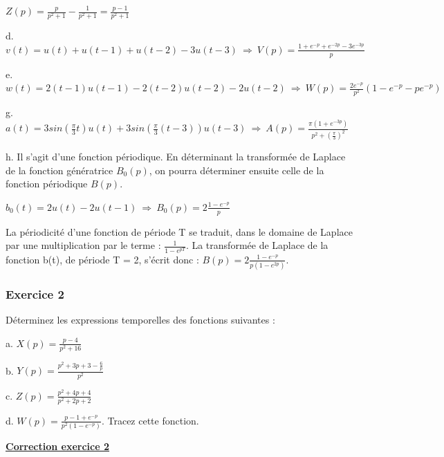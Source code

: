 \documentclass[11pt]{report}
\begin{document}
	$Z(p) = \frac{p}{p^{2}+1}-\frac{1}{p^{2}+1}=\frac{p-1}{p^{2}+1}$
	
	\vspace{0.5\baselineskip}
	
	d. $v(t) = u(t)+u(t-1)+u(t-2)-3u(t-3)~\Rightarrow~V(p)=\frac{1+e^{-p}+e^{-2p}-3e^{-3p}}{p}$ 
	
	\vspace{0.5\baselineskip}
	
	e. $w(t) = 2(t-1)u(t-1)-2(t-2)u(t-2)-2u(t-2)~\Rightarrow~W(p)=\frac{2e^{-p}}{p^{2}}(1-e^{-p}-pe^{-p})$ 
	
	\vspace{0.5\baselineskip}
	
	g. $a(t)=3sin(\frac{\pi}{3}t)u(t)+3sin(\frac{\pi}{3}(t-3))u(t-3)~\Rightarrow~A(p)=\frac{\pi(1+e^{-3p})}{p^{2}+(\frac{\pi}{3})^{2}}$
	
	\vspace{0.5\baselineskip}
	
	h. Il s'agit d'une fonction périodique. En déterminant la transformée de Laplace de la fonction génératrice $B_{0}(p)$, on pourra déterminer ensuite celle de la fonction périodique $B(p)$.
	
	$b_{0}(t)=2u(t)-2u(t-1)~\Rightarrow~B_{0}(p)=2\frac{1-e^{-p}}{p}$
	
	La périodicité d'une fonction de période T se traduit, dans le domaine de Laplace par une multiplication par le terme : $\frac{1}{1-e^{pT}}$. La transformée de Laplace de la fonction b(t), de période T = 2, s'écrit donc : $B(p) =2\frac{1-e^{-p}}{p(1-e^{2p})} $.
	
	\vspace{0.5\baselineskip}
	
	
	\subsubsection{Exercice 2}
	
	Déterminez les expressions temporelles des fonctions suivantes :
	
	a. $X(p)=\frac{p-4}{p^{2}+16}$ 
	
	b. $Y(p) = \frac{p^{2}+3p+3-\frac{6}{p}}{p^{2}}$ 
	
	c. $Z(p) = \frac{p^{2}+4p+4}{p^{2}+2p+2}$
	
	d. $W(p) = \frac{p-1+e^{-p}}{p^{2}(1-e^{-p})}$. Tracez cette fonction.
	
	
	\vspace{1\baselineskip}
	
	\textbf{\underline{Correction exercice 2}}\\
	
\end{document}
